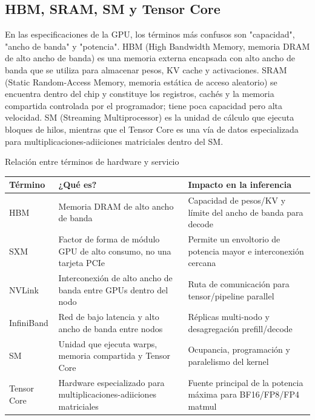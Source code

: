 \subsection{HBM, SRAM, SM y Tensor Core}

En las especificaciones de la GPU, los términos más confusos son "capacidad", "ancho de banda" y "potencia". HBM (High Bandwidth Memory, memoria DRAM de alto ancho de banda) es una memoria externa encapsada con alto ancho de banda que se utiliza para almacenar pesos, KV cache y activaciones. SRAM (Static Random-Access Memory, memoria estática de acceso aleatorio) se encuentra dentro del chip y constituye los registros, cachés y la memoria compartida controlada por el programador; tiene poca capacidad pero alta velocidad. SM (Streaming Multiprocessor) es la unidad de cálculo que ejecuta bloques de hilos, mientras que el Tensor Core es una vía de datos especializada para multiplicaciones-adiiciones matriciales dentro del SM.


\begin{knowledgebox}{Relación entre términos de hardware y servicio}
\begin{tabularx}{\textwidth}{L{2.4cm}YY}
\toprule
Término & ¿Qué es? & Impacto en la inferencia \\
\midrule
HBM & Memoria DRAM de alto ancho de banda & Capacidad de pesos/KV y límite del ancho de banda para decode \\
SXM & Factor de forma de módulo GPU de alto consumo, no una tarjeta PCIe & Permite un envoltorio de potencia mayor e interconexión cercana \\
NVLink & Interconexión de alto ancho de banda entre GPUs dentro del nodo & Ruta de comunicación para tensor/pipeline parallel \\
InfiniBand & Red de bajo latencia y alto ancho de banda entre nodos & Réplicas multi-nodo y desagregación prefill/decode \\
SM & Unidad que ejecuta warps, memoria compartida y Tensor Core & Ocupancia, programación y paralelismo del kernel \\
Tensor Core & Hardware especializado para multiplicaciones-adiiciones matriciales & Fuente principal de la potencia máxima para BF16/FP8/FP4 matmul \\
\bottomrule
\end{tabularx}
\end{knowledgebox}

